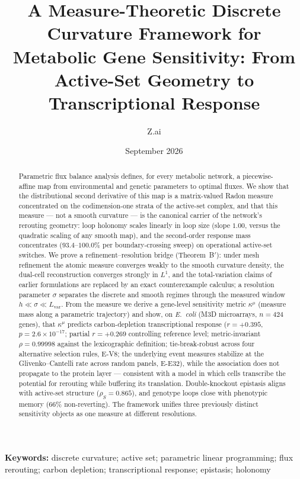 \documentclass[11pt,a4paper]{article}
\title{A Measure-Theoretic Discrete Curvature Framework for Metabolic
       Gene Sensitivity: From Active-Set Geometry to Transcriptional
       Response}
\author{Z.ai}
\date{September 2026}
\theoremstyle{plain}
\theoremstyle{definition}
\theoremstyle{remark}
\newcommand{\kmu}{\kappa^{\mu}}
\begin{document}
\maketitle

\begin{abstract}
\noindent
Parametric flux balance analysis defines, for every metabolic network, a
piecewise-affine map from environmental and genetic parameters to optimal
fluxes. We show that the distributional second derivative of this map is a
matrix-valued Radon measure concentrated on the codimension-one strata of the
active-set complex, and that this measure --- not a smooth curvature ---
is the canonical carrier of the network's rerouting geometry: loop holonomy
scales linearly in loop size (slope $1.00$, versus the quadratic scaling of
any smooth map), and the second-order response mass concentrates
($93.4$--$100.0\%$ per boundary-crossing sweep) on operational active-set
switches. We prove a
refinement--resolution bridge (Theorem~B$'$): under mesh refinement the
atomic measure converges weakly to the smooth curvature density, the
dual-cell reconstruction converges strongly in $L^1$, and the total-variation
claims of earlier formulations are replaced by an exact counterexample
calculus; a resolution parameter $\sigma$ separates the discrete and smooth
regimes through the measured window $h \ll \sigma \ll L_{\mathrm{var}}$.
From the measure we derive a gene-level sensitivity metric $\kmu$ (measure
mass along a parametric trajectory) and show, on
\emph{E.~coli} (M3D microarrays, $n=424$ genes), that $\kmu$ predicts
carbon-depletion transcriptional response ($r = +0.395$,
$p = 2.6 \times 10^{-17}$; partial $r = +0.269$ controlling reference
level; metric-invariant $\rho = 0.99998$ against the lexicographic
definition; tie-break-robust across four alternative selection rules,
E-V8; the underlying event measures stabilize at the
Glivenko--Cantelli rate across random panels, E-E32), while the
association does not propagate to the protein layer
--- consistent with a model in which cells transcribe the potential for
rerouting while buffering its translation. Double-knockout epistasis aligns
with active-set structure ($\rho_S = 0.865$), and genotype loops close with
phenotypic memory ($66\%$ non-reverting). The framework unifies three
previously distinct sensitivity objects as one measure at different
resolutions.
\end{abstract}

\medskip
\noindent\textbf{Keywords:} discrete curvature; active set; parametric
linear programming; flux rerouting; carbon depletion; transcriptional
response; epistasis; holonomy
\end{document}
